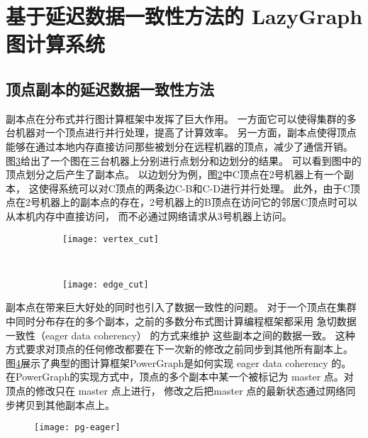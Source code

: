 \section{基于延迟数据一致性方法的 LazyGraph 图计算系统}
\subsection{顶点副本的延迟数据一致性方法}

副本点在分布式并行图计算框架中发挥了巨大作用。
一方面它可以使得集群的多台机器对一个顶点进行并行处理，提高了计算效率。
另一方面，副本点使得顶点能够在通过本地内存直接访问那些被划分在远程机器的顶点，减少了通信开销。
图\ref{fig:graph_cut}给出了一个图在三台机器上分别进行点划分和边划分的结果。
可以看到图中的顶点划分之后产生了副本点。
以边划分为例，图\ref{fig:edge_cut}中C顶点在2号机器上有一个副本，
这使得系统可以对C顶点的两条边C-B和C-D进行并行处理。
此外，由于C顶点在2号机器上的副本点的存在，2号机器上的B顶点在访问它的邻居C顶点时可以从本机内存中直接访问，
而不必通过网络请求从3号机器上访问。



\begin{figure}[!htbp]
  \centering
  \begin{subfigure}[b]{0.35\textwidth}
    \texttt{[image: vertex\_cut]}
    \caption{}
    \label{fig:vertex_cut}
  \end{subfigure}%
  ~%
  \begin{subfigure}[b]{0.35\textwidth}
    \texttt{[image: edge\_cut]}
    \caption{}
    \label{fig:edge_cut}
  \end{subfigure}
\label{fig:graph_cut}
\end{figure}


副本点在带来巨大好处的同时也引入了数据一致性的问题。
对于一个顶点在集群中同时分布存在的多个副本，之前的多数分布式图计算编程框架都采用 急切数据一致性（eager data coherency） 的方式来维护
这些副本之间的数据一致。
这种方式要求对顶点的任何修改都要在下一次新的修改之前同步到其他所有副本上。
图\ref{fig:pg-eager}展示了典型的图计算框架PowerGraph是如何实现 eager data coherency 的。
在PowerGraph的实现方式中，顶点的多个副本中某一个被标记为 master 点。对顶点的修改只在 master 点上进行，
修改之后把master 点的最新状态通过网络同步拷贝到其他副本点上。

\begin{figure}[!htbp]
  \centering
  \texttt{[image: pg-eager]}
  \label{fig:pg-eager}
\end{figure}

